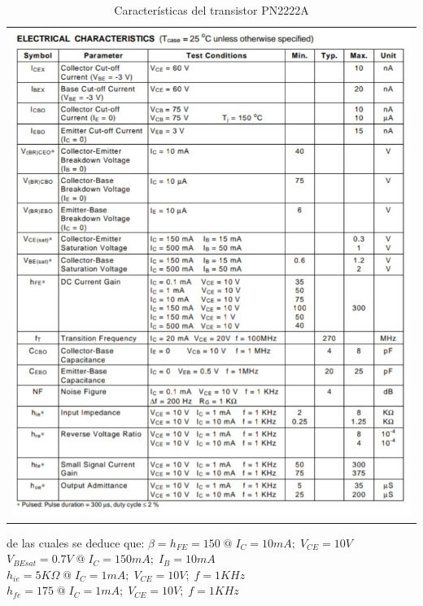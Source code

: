 \documentclass[10pt, a4paper]{article}
\begin{document}
    \begin{table}[h!]
        \centering
        \caption{Características del transistor PN2222A} %
        \label{tab:especificaciones} %
        \begin{tabular}{c}
            \includegraphics[height=20cm\textwidth]{pn2222a.jpg} \\
        \end{tabular}
    \end{table}
    
    de las cuales se deduce que:
    $\beta = h_{FE} = 150 \; @ \; I_C = 10mA; \; V_{CE} = 10V$
    $V_{BEsat} = 0.7V \; @ \; I_C = 150mA; \; I_B = 10mA$
    $h_{ie} = 5K\Omega \; @ \; I_C = 1mA; \; V_{CE} = 10V; \; f = 1KHz$
    $h_{fe} = 175 \; @ \; I_C = 1mA; \; V_{CE} = 10V; \; f = 1KHz$
\end{document}
